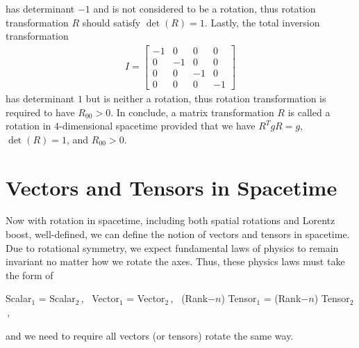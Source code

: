 \documentclass[11pt, onesided]{book}
\theoremstyle{break}
\theoremstyle{break}
\newcommand{\bmat}[1]{\begin{bmatrix} #1 \end{bmatrix}}
\begin{document}
has determinant $-1$ and is not considered to be a rotation, thus rotation transformation $R$ should satisfy $\det (R) = 1$. Lastly, the total inversion transformation
\begin{align*}
I = \bmat{-1 & 0 & 0 & 0\\
0 & -1 & 0 & 0\\
0 & 0 & -1 & 0\\
0 & 0 & 0 & -1}
\end{align*}
has determinant $1$ but is neither a rotation, thus rotation transformation is required to have $R_{00} >0$. In conclude, a matrix transformation $R$ is called a rotation in $4$-dimensional spacetime provided that we have $R^Tg R = g$, $\det(R) = 1$, and $R_{00} >0$.


\section[Vectors and Tensors in Spacetime]{\color{red} Vectors and Tensors in Spacetime\color{black}}
Now with rotation in spacetime, including both spatial rotations and Lorentz boost, well-defined, we can define the notion of vectors and tensors in spacetime. Due to rotational symmetry, we expect fundamental laws of physics to remain invariant no matter how we rotate the axes. Thus, these
physics laws must take the form of
\begin{center}
Scalar$_1$ = Scalar$_2$\,,\ \quad
Vector$_1$ = Vector$_2$\,,\ \quad
(Rank$-n$) Tensor$_1$ = (Rank$-n$) Tensor$_2$\,,
\end{center}
and we need to require all vectors (or tensors) rotate the same way. \\
\end{document}
